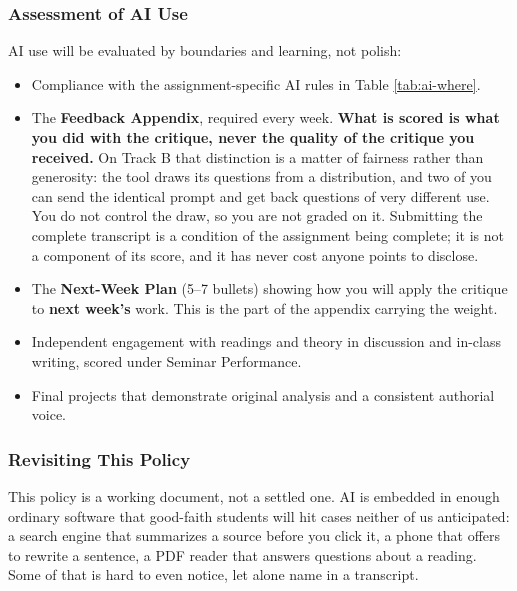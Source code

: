 \documentclass[11pt]{article}     %
\begin{document}
\begin{itemize}
\end{itemize}

\subsubsection*{Assessment of AI Use}

AI use will be evaluated by boundaries and learning, not polish:

\begin{itemize}
    \item Compliance with the assignment-specific AI rules in Table \ref{tab:ai-where}.
    \item The \textbf{Feedback Appendix}, required every week. \textbf{What is scored is what you did with the critique, never the quality of the critique you received.} On Track B that distinction is a matter of fairness rather than generosity: the tool draws its questions from a distribution, and two of you can send the identical prompt and get back questions of very different use. You do not control the draw, so you are not graded on it. Submitting the complete transcript is a condition of the assignment being complete; it is not a component of its score, and it has never cost anyone points to disclose.
    \item The \textbf{Next-Week Plan} (5--7 bullets) showing how you will apply the critique to \textbf{next week's} work. This is the part of the appendix carrying the weight.
    \item Independent engagement with readings and theory in discussion and in-class writing, scored under Seminar Performance.
    \item Final projects that demonstrate original analysis and a consistent authorial voice.
\end{itemize}

\subsubsection*{Revisiting This Policy}

\noindent This policy is a working document, not a settled one. AI is embedded in enough ordinary software that good-faith students will hit cases neither of us anticipated: a search engine that summarizes a source before you click it, a phone that offers to rewrite a sentence, a PDF reader that answers questions about a reading. Some of that is hard to even notice, let alone name in a transcript.
\end{document}
